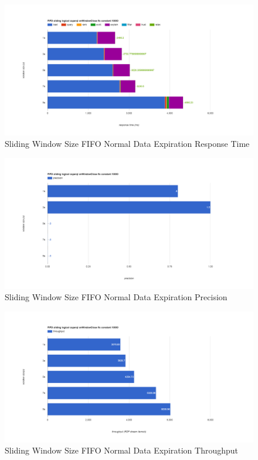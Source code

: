 \begin{figure}[!htbp]
    \centering
    \includegraphics[width=\textwidth]{img/app3-slide-ws-fifo-normal-r.png}
    \caption{Sliding Window Size FIFO Normal Data Expiration Response Time}
\end{figure}
\begin{figure}[!htbp]
    \centering
    \includegraphics[width=\textwidth]{img/app3-slide-ws-fifo-normal-p.png}
    \caption{Sliding Window Size FIFO Normal Data Expiration Precision}
\end{figure}
\begin{figure}[!htbp]
    \centering
    \includegraphics[width=\textwidth]{img/app3-slide-ws-fifo-normal-t.png}
    \caption{Sliding Window Size FIFO Normal Data Expiration Throughput}
\end{figure}
